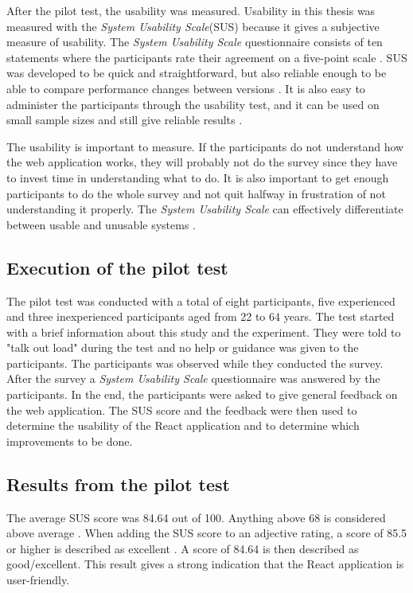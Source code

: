 After the pilot test, the usability was measured. Usability in this thesis was measured with the \textit{System Usability Scale}(SUS) because it gives a subjective measure of usability. The \textit{System Usability Scale} questionnaire consists of ten statements where the participants rate their agreement on a five-point scale \citep{Ben2009}. SUS was developed to be quick and straightforward, but also reliable enough to be able to compare performance changes between versions \citep{Brooke1996}. It is also easy to administer the participants through the usability test, and it can be used on small sample sizes and still give reliable results \citep{Affairs2013}.  

The usability is important to measure. If the participants do not understand how the web application works, they will probably not do the survey since they have to invest time in understanding what to do. %
It is also important to get enough participants to do the whole survey and not quit halfway in frustration of not understanding it properly. The \textit{System Usability Scale} can effectively differentiate between usable and unusable systems \citep{Affairs2013}. 

\subsection{Execution of the pilot test}
The pilot test was conducted with a total of eight participants, five experienced and three inexperienced participants aged from 22 to 64 years. The test started with a brief information about this study and the experiment. They were told to "talk out load" during the test and no help or guidance was given to the participants. The participants was observed while they conducted the survey. After the survey a \textit{System Usability Scale} questionnaire was answered by the participants. In the end, the participants were asked to give general feedback on the web application. The SUS score and the feedback were then used to determine the usability of the React application and to determine which improvements to be done.  

\subsection{Results from the pilot test}
The average SUS score was 84.64 out of 100. Anything above 68 is considered above average \citep{Affairs2013}. When adding the SUS score to an adjective rating, a score of 85.5 or higher is described as excellent \citep{Bangor2009}. A score of 84.64 is then described as good/excellent. This result gives a strong indication that the React application is user-friendly. 

